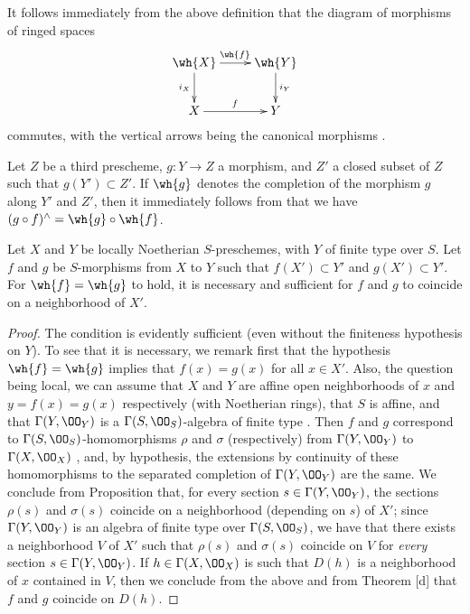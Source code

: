 \begin{env}[10.9.2]
\label{1.10.9.2}
It follows immediately from the above definition that the diagram of morphisms of ringed spaces
\[
  \xymatrix{
    \wh{X}\ar[r]^{\wh{f}}\ar[d]_{i_X} &
    \wh{Y}\ar[d]^{i_Y}\\
    X\ar[r]^f &
    Y
  }
\]
commutes, with the vertical arrows being the canonical morphisms .
\end{env}

\begin{env}[10.9.3]
\label{1.10.9.3}
Let $Z$ be a third prescheme, $g:Y\to Z$ a morphism, and $Z'$ a closed subset of $Z$ such that $g(Y')\subset Z'$.
If $\wh{g}$ denotes the completion of the morphism $g$ along $Y'$ and $Z'$, then it immediately follows from  that we have $(g\circ f)^\wedge=\wh{g}\circ\wh{f}$.
\end{env}

\begin{prop}[10.9.4]
\label{1.10.9.4}
Let $X$ and $Y$ be locally Noetherian $S$-preschemes, with $Y$ of finite type over $S$.
Let $f$ and $g$ be $S$-morphisms from $X$ to $Y$ such that $f(X')\subset Y'$ and $g(X')\subset Y'$.
For $\wh{f}=\wh{g}$ to hold, it is necessary and sufficient for $f$ and $g$ to coincide on a neighborhood of $X'$.
\end{prop}

\begin{proof}
\label{proof-1.10.9.4}
The condition is evidently sufficient (even without the finiteness hypothesis on $Y$).
To see that it is necessary, we remark first that the hypothesis $\wh{f}=\wh{g}$ implies that $f(x)=g(x)$ for all $x\in X'$.
Also, the question being local, we can assume that $X$ and $Y$ are affine open neighborhoods of $x$ and $y=f(x)=g(x)$ respectively (with Noetherian rings), that $S$ is affine, and that $\Gamma(Y,\OO_Y)$ is a $\Gamma(S,\OO_S)$-algebra of finite type .
Then $f$ and $g$ correspond to $\Gamma(S,\OO_S)$-homomorphisms $\rho$ and $\sigma$ (respectively) from $\Gamma(Y,\OO_Y)$ to $\Gamma(X,\OO_X)$ , and, by hypothesis, the extensions by continuity of these homomorphisms to the separated completion of $\Gamma(Y,\OO_Y)$ are the same.
We conclude from Proposition  that, for every section $s\in\Gamma(Y,\OO_Y)$, the sections $\rho(s)$ and $\sigma(s)$ coincide on a neighborhood (depending on $s$) of $X'$; since $\Gamma(Y,\OO_Y)$ is an algebra of finite type over $\Gamma(S,\OO_S)$, we have that there exists a neighborhood $V$ of $X'$ such that $\rho(s)$ and $\sigma(s)$ coincide on $V$ for \emph{every} section $s\in\Gamma(Y,\OO_Y)$.
If $h\in\Gamma(X,\OO_X)$ is such that $D(h)$ is a neighborhood of $x$ contained in $V$, then we conclude from the above and from Theorem [d] that $f$ and $g$ coincide on $D(h)$.
\end{proof}

